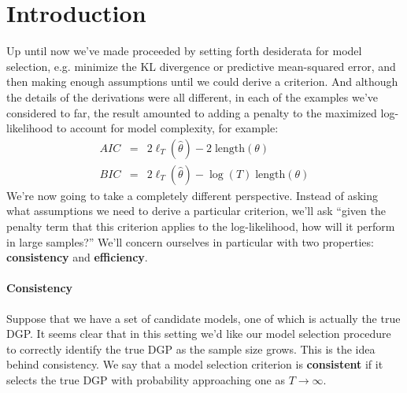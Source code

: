 \documentclass[12pt]{article}
\theoremstyle{definition}
\begin{document}




\section{Introduction}
Up until now we've made proceeded by setting forth desiderata for model selection, e.g. minimize the KL divergence or predictive mean-squared error, and then making enough assumptions until we could derive a criterion. And although the details of the derivations were all different, in each of the examples we've considered to far, the result amounted to adding a penalty to the maximized log-likelihood to account for model complexity, for example:
	\begin{eqnarray*}
		AIC &=& 2\ell_T(\widehat{\theta}) - 2\; \mbox{length}(\theta)\\
		BIC &=& 2\ell_T(\widehat{\theta}) - \log(T)\; \mbox{length}(\theta)
	\end{eqnarray*}
We're now going to take a completely different perspective. Instead of asking what assumptions we need to derive a particular criterion, we'll ask ``given the penalty term that this criterion applies to the log-likelihood, how will it perform in large samples?'' We'll concern ourselves in particular with two properties: \textbf{consistency} and \textbf{efficiency}. 

\paragraph{Consistency} Suppose that we have a set of candidate models, one of which is actually the true DGP. It seems clear that in this setting we'd like our model selection procedure to correctly identify the true DGP as the sample size grows. This is the idea behind consistency. We say that a model selection criterion is \textbf{consistent} if it selects the true DGP with probability approaching one as $T\rightarrow \infty$. 
\end{document}

